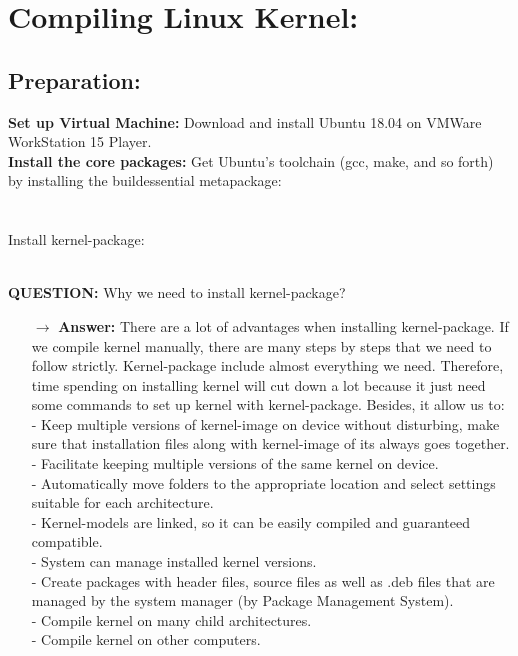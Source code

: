 \documentclass[a4paper]{article}
\begin{document}
\section{Compiling Linux Kernel:}
\subsection{Preparation:}
\textbf{Set up Virtual Machine:} Download and install Ubuntu 18.04 on VMWare WorkStation 15 Player.\\
\textbf{Install the core packages:} Get Ubuntu's toolchain (gcc, make, and so forth) by installing the buildessential metapackage:\\
\noindent{}\\
\\
Install kernel-package:\\
\noindent{}\\
\begin{mdframed}[hidealllines=true,backgroundcolor=blue!10]
\textbf{QUESTION:} Why we need to install kernel-package?
\begin{itemize}
\item[$\rightarrow$] \textbf{Answer:} There are a lot of advantages when installing kernel-package. If we compile kernel manually, there are many steps by steps that we need to follow strictly. Kernel-package include almost everything we need. Therefore, time spending on installing kernel will cut down a lot because it just need some commands to set up kernel with kernel-package. Besides, it allow us to:\\
 - Keep multiple versions of kernel-image on device without disturbing, make sure that installation files along with kernel-image of its always goes together.\\
 - Facilitate keeping multiple versions of the same kernel on device.\\
 - Automatically move folders to the appropriate location and select settings suitable for each architecture.\\
 - Kernel-models are linked, so it can be easily compiled and guaranteed compatible.\\
 - System can manage installed kernel versions.\\
 - Create packages with header files, source files as well as .deb files that are managed by the system manager (by Package Management System).\\
 - Compile kernel on many child architectures.\\
 - Compile kernel on other computers.
\end{itemize}
\end{mdframed}
\end{document}
